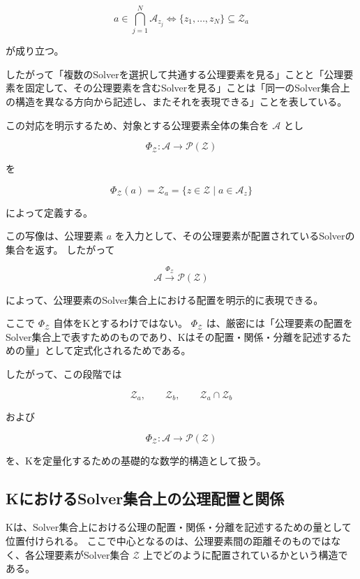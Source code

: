 \[
a\in\bigcap_{j=1}^{N}\mathcal{A}_{z_j}
\iff
\{z_1,\ldots,z_N\}\subseteq\mathcal{Z}_a
\]

が成り立つ。

したがって「複数のSolverを選択して共通する公理要素を見る」ことと「公理要素を固定して、その公理要素を含むSolverを見る」ことは「同一のSolver集合上の構造を異なる方向から記述し、またそれを表現できる」ことを表している。

この対応を明示するため、対象とする公理要素全体の集合を $\mathcal{A}$ とし

\[
\Phi_{\mathcal{Z}}:\mathcal{A}\to\mathcal{P}(\mathcal{Z})
\]

を

\[
\Phi_{\mathcal{Z}}(a) = \mathcal{Z}_a = \{z\in\mathcal{Z}\mid a\in\mathcal{A}_z\}
\]

によって定義する。

この写像は、公理要素 $a$ を入力として、その公理要素が配置されているSolverの集合を返す。
したがって


\[
\mathcal{A}
\xrightarrow{\Phi_{\mathcal{Z}}}
\mathcal{P}(\mathcal{Z})
\]

によって、公理要素のSolver集合上における配置を明示的に表現できる。

ここで $\Phi_{\mathcal{Z}}$ 自体をKとするわけではない。
$\Phi_{\mathcal{Z}}$ は、厳密には「公理要素の配置をSolver集合上で表すためのものであり、Kはその配置・関係・分離を記述するための量」として定式化されるためである。

したがって、この段階では

\[
\mathcal{Z}_a,\qquad
\mathcal{Z}_b,\qquad
\mathcal{Z}_a\cap\mathcal{Z}_b
\]

および

\[
\Phi_{\mathcal{Z}}:\mathcal{A}\to\mathcal{P}(\mathcal{Z})
\]

を、Kを定量化するための基礎的な数学的構造として扱う。

\subsection{KにおけるSolver集合上の公理配置と関係}

Kは、Solver集合上における公理の配置・関係・分離を記述するための量として位置付けられる。
ここで中心となるのは、公理要素間の距離そのものではなく、各公理要素がSolver集合 $\mathcal{Z}$ 上でどのように配置されているかという構造である。

